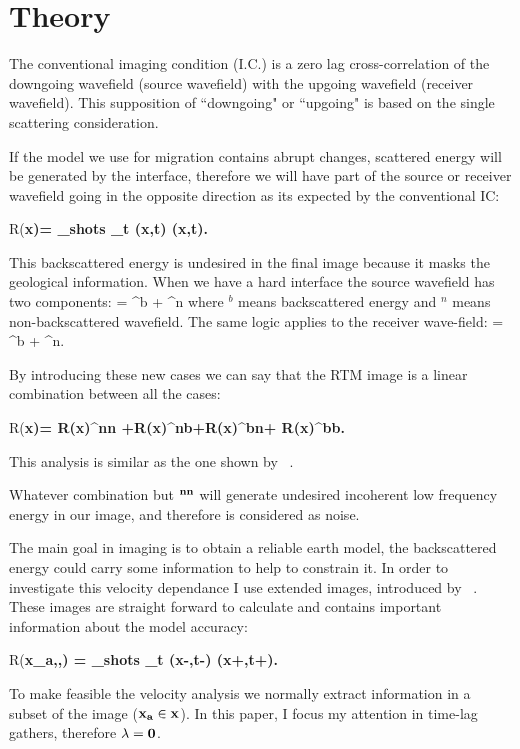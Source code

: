 \section{Theory}

The conventional imaging condition (I.C.) is a zero lag cross-correlation of the downgoing wavefield (source 
wavefield) with the upgoing wavefield (receiver wavefield). This supposition of ``downgoing" or ``upgoing"
is based on the single scattering consideration.

If the model we use for migration contains abrupt changes,  scattered energy will be generated by the interface,
therefore we will have part of the source or receiver wavefield going in the opposite direction as its expected 
by the conventional IC:


\beq
R(\bf{x})= \sum_{shots} \sum_t \US(\bf{x},t) \UR(\bf{x},t).
\label{eq:IC}
\eeq

This backscattered energy is undesired in the final image because it masks the geological information. When we have a 
hard interface the source wavefield has two components:
\beq
\US= \US^b + \US^n
\eeq
where $^b$ means backscattered energy and $^n$ means non-backscattered wavefield. The same logic applies to 
the receiver wave-field:
\beq
\UR= \UR^b + \UR^n.
\eeq

By introducing these new cases we can say that the RTM image is a linear combination between all the cases:

\beq
R(\bf{x})= R(\bf{x})^{nn} +R(\bf{x})^{nb}+R(\bf{x})^{bn}+ R(\bf{x})^{bb}.
\label{eq:cases}
\eeq

This analysis is similar as the one shown by ~\cite{fei:3130}.

Whatever combination but $\bf^{nn}$ will generate undesired incoherent low frequency energy in our image, and therefore
is considered as noise.

The main goal in imaging is to obtain a reliable earth model, the backscattered energy could carry some information to
help to constrain it. In order to investigate this velocity dependance I use extended images, introduced by ~\cite{sava:S209}.
These images are straight forward to calculate and contains important information about the model accuracy:

\beq
R(\bf{x_a},\bf{\lambda},\tau) =  \sum_{shots} \sum_t \US(\bf{x}-\bf{\lambda},t-\tau) \UR(\bf{x}+\bf{\lambda},t+\tau).
\eeq

To make feasible the velocity analysis we normally extract information in a subset of the image ($\bf{x_a} \in \bf{x}$). In this paper,
I focus my attention in time-lag gathers, therefore $\bf{\lambda}=0$.